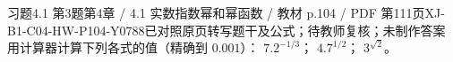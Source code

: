 \par\noindent\begin{minipage}{\linewidth}
\begin{bankitem}{习题4.1 第3题}{第4章 / 4.1 实数指数幂和幂函数 / 教材 p.104 / PDF 第111页}{XJ-B1-C04-HW-P104-Y0788}{已对照原页转写题干及公式；待教师复核；未制作答案}
用计算器计算下列各式的值（精确到 $0.001$）：
$7.2^{-1/3}$；
$4.7^{1/2}$；
$3^{\sqrt2}$。
\end{bankitem}
\end{minipage}\par\medskip
